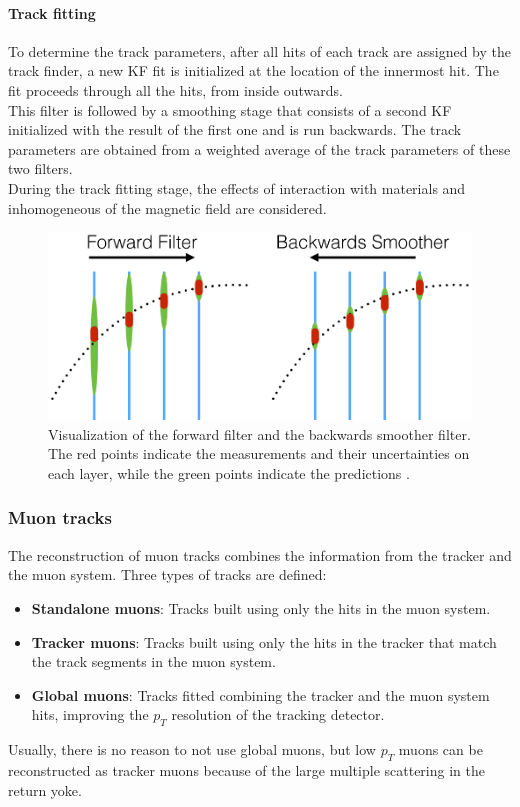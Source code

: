 \paragraph*{Track fitting}
To determine the track parameters, after all hits of each track are assigned by the track finder, a new KF fit is initialized at the location of the innermost hit. The fit proceeds through all the hits, from inside outwards.\\
This filter is followed by a smoothing stage that consists of a second KF initialized with the result of the first one and is run backwards. The track parameters are obtained from a weighted average of the track parameters of these two filters.\\
During the track fitting stage, the effects of interaction with materials and  inhomogeneous of the magnetic field are considered.

\begin{figure}[H]
    \centering
    \includegraphics[width=0.75\linewidth]{fig//chap04-reco/KF.png}
    \caption{Visualization of the forward filter and the backwards smoother filter. The red points indicate the measurements and their uncertainties on each layer, while the green points indicate the predictions \cite{Ai2021AFitting}.}
    \label{fig:KF}
\end{figure}

\subsubsection*{Muon tracks}
The reconstruction of muon tracks combines the information from the tracker and the muon system. Three types of tracks are defined:
\begin{itemize}
    \item \textbf{Standalone muons}: Tracks built using only the hits in the muon system.
    \item \textbf{Tracker muons}: Tracks built using only the hits in the tracker that match the track segments in the muon system.
    \item \textbf{Global muons}: Tracks fitted combining the tracker and the muon system hits, improving the $p_T$ resolution of the tracking detector.
\end{itemize}
Usually, there is no reason to not use global muons, but low $p_T$ muons can be reconstructed as tracker muons because of the large multiple scattering in the return yoke. 

